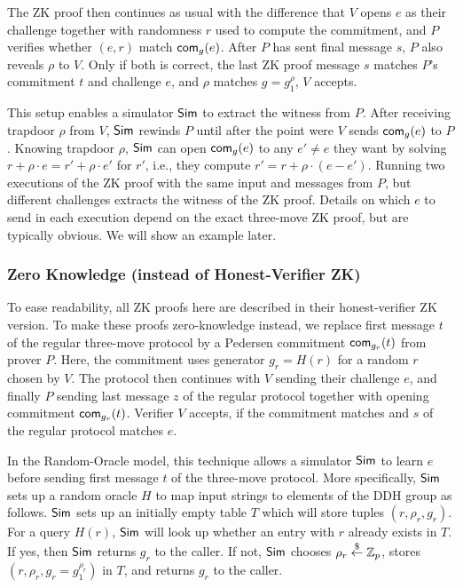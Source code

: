 The ZK proof then continues as usual with the difference that $V$
opens $e$ as their challenge together with randomness $r$ used to
compute the commitment, and $P$ verifies whether $(e,r)$ match
$\mathsf{com}_g(e)$.  After $P$ has sent final message $s$, $P$ also
reveals $\rho$ to $V$. Only if both is correct, the last ZK proof
message $s$ matches $P$'s commitment $t$ and challenge $e$, and $\rho$
matches $g=g_1^\rho$, $V$ accepts.

This setup enables a simulator ${\mathsf{Sim}}$ to extract the witness from
$P$. After receiving trapdoor $\rho$ from $V$, ${\mathsf{Sim}}$ rewinds $P$ until
after the point were $V$ sends $\mathsf{com}_g(e)$ to $P$. Knowing trapdoor
$\rho$, ${\mathsf{Sim}}$ can open $\mathsf{com}_g(e)$ to any $e'\neq{}e$ they want by
solving $r+\rho\cdot{}e=r'+\rho\cdot{}e'$ for $r'$, i.e., they compute
$r'=r+\rho\cdot{}(e-e')$. Running two executions of the ZK proof with the
same input and messages from $P$, but different challenges extracts
the witness of the ZK proof. Details on which $e$ to send in each
execution depend on the exact three-move ZK proof, but are typically
obvious. We will show an example later.

\subsubsection{Zero Knowledge (instead of Honest-Verifier ZK)}
To ease readability, all ZK proofs here are described in their
honest-verifier ZK version. To make these proofs zero-knowledge
instead, we replace first message $t$ of the regular three-move
protocol by a Pedersen commitment $\mathsf{com}_{g_r}(t)$ from prover
$P$. Here, the commitment uses generator $g_r=H(r)$ for a random $r$
chosen by $V$. The protocol then continues with $V$ sending their
challenge $e$, and finally $P$ sending last message $z$ of the regular
protocol together with opening commitment $\mathsf{com}_{g_r}(t)$. Verifier
$V$ accepts, if the commitment matches and $s$ of the regular protocol
matches $e$.

In the Random-Oracle model, this technique allows a simulator ${\mathsf{Sim}}$
to learn $e$ before sending first message $t$ of the three-move
protocol.  More specifically, ${\mathsf{Sim}}$ sets up a random oracle $H$ to
map input strings to elements of the DDH group as follows. ${\mathsf{Sim}}$ sets
up an initially empty table $T$ which will store tuples
$(r,\rho_r,g_r)$. For a query $H(r)$, ${\mathsf{Sim}}$ will look up whether an
entry with $r$ already exists in $T$. If yes, then ${\mathsf{Sim}}$ returns
$g_r$ to the caller. If not, ${\mathsf{Sim}}$ chooses $\rho_r\stackrel{\$}{\leftarrow}\mathbb{Z}_p$, stores
$(r,\rho_r,g_r=g_1^{\rho_r})$ in $T$, and returns $g_r$ to the caller.

